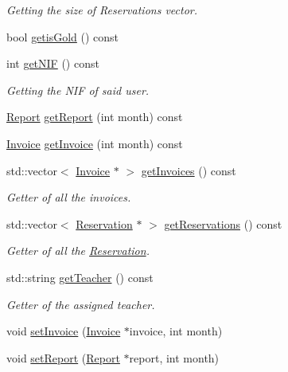 \begin{DoxyCompactItemize}
\begin{DoxyCompactList}\small\item\em Getting the size of Reservations vector. \end{DoxyCompactList}\item 
bool \mbox{\hyperlink{class_user_abd33fb93abc0209808bab9ffc6c2482c}{getis\+Gold}} () const
\item 
int \mbox{\hyperlink{class_user_a5e98c1820005dd6915bccd75bd573cea}{get\+N\+IF}} () const
\begin{DoxyCompactList}\small\item\em Getting the N\+IF of said user. \end{DoxyCompactList}\item 
\mbox{\hyperlink{class_report}{Report}} \mbox{\hyperlink{class_user_a655a16e4a6e044d973b54073cdb4bc96}{get\+Report}} (int month) const
\item 
\mbox{\hyperlink{class_invoice}{Invoice}} \mbox{\hyperlink{class_user_a82cb8a4c8f92d2a31fb2e8b0cff001f6}{get\+Invoice}} (int month) const
\item 
std\+::vector$<$ \mbox{\hyperlink{class_invoice}{Invoice}} $\ast$ $>$ \mbox{\hyperlink{class_user_ab633b50f8af608b0058c66fa5ced8494}{get\+Invoices}} () const
\begin{DoxyCompactList}\small\item\em Getter of all the invoices. \end{DoxyCompactList}\item 
std\+::vector$<$ \mbox{\hyperlink{class_reservation}{Reservation}} $\ast$ $>$ \mbox{\hyperlink{class_user_a52c283b101a310a3be644bb9f8552f34}{get\+Reservations}} () const
\begin{DoxyCompactList}\small\item\em Getter of all the \mbox{\hyperlink{class_reservation}{Reservation}}. \end{DoxyCompactList}\item 
std\+::string \mbox{\hyperlink{class_user_aafe37a3bb0e14e669e42f2fee9e0ce29}{get\+Teacher}} () const
\begin{DoxyCompactList}\small\item\em Getter of the assigned teacher. \end{DoxyCompactList}\item 
void \mbox{\hyperlink{class_user_ad0432b83c7379ca57ed782d2929f3b8a}{set\+Invoice}} (\mbox{\hyperlink{class_invoice}{Invoice}} $\ast$invoice, int month)
\item 
void \mbox{\hyperlink{class_user_a0cdc359989bc67c3a135737cf1232a49}{set\+Report}} (\mbox{\hyperlink{class_report}{Report}} $\ast$report, int month)

\end{DoxyCompactItemize}
